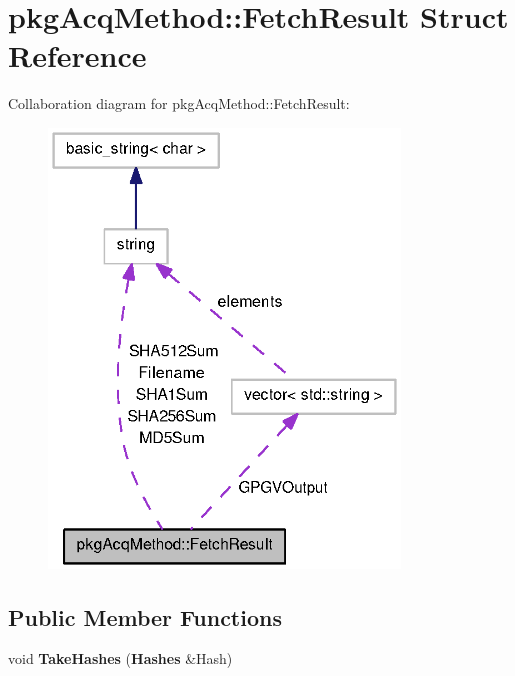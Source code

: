 \section{pkg\-Acq\-Method\-:\-:\-Fetch\-Result \-Struct \-Reference}
\label{structpkgAcqMethod_1_1FetchResult}


\-Collaboration diagram for pkg\-Acq\-Method\-:\-:\-Fetch\-Result\-:
\nopagebreak
\begin{figure}[H]
\begin{center}
\leavevmode
\includegraphics[width=265pt]{structpkgAcqMethod_1_1FetchResult__coll__graph}
\end{center}
\end{figure}
\subsection*{\-Public \-Member \-Functions}
\begin{DoxyCompactItemize}
\item 
void {\bfseries \-Take\-Hashes} ({\bf \-Hashes} \&\-Hash)\label{structpkgAcqMethod_1_1FetchResult_a1b2f366e0ff90b225af368326c92a573}

\end{DoxyCompactItemize}
